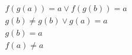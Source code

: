 \begin{align*}
%
& f(g(a)) = a \lor f(g(b)) = a
~\\~
& g(b)  \neq  g(b) \lor g(a) = a
~\\~
& g(b) = a
~\\~
& f(a)  \neq  a
%
\end{align*}
